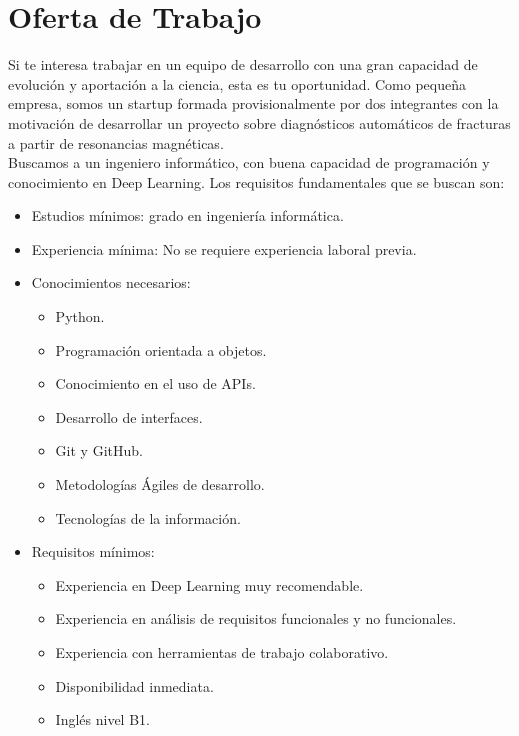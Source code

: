 	\listoftables	
	
	\newpage	
 
\section{Oferta de Trabajo}

Si te interesa trabajar en un equipo de desarrollo con una gran capacidad de evolución y aportación a la ciencia, esta es tu oportunidad. Como pequeña empresa, somos un startup formada provisionalmente por dos integrantes con la motivación de desarrollar un proyecto sobre diagnósticos automáticos de fracturas a partir de resonancias magnéticas. \\

Buscamos a un ingeniero informático, con buena capacidad de programación y conocimiento en Deep Learning. Los requisitos fundamentales que se buscan son:

\begin{itemize}
	\item Estudios mínimos: grado en ingeniería informática.
	\item Experiencia mínima: No se requiere experiencia laboral previa.	
	\item Conocimientos necesarios:
		\begin{itemize}
			\item Python.
			\item Programación orientada a objetos.
			\item Conocimiento en el uso de APIs.
			\item Desarrollo de interfaces.
			\item Git y GitHub.
			\item Metodologías Ágiles de desarrollo.
			\item Tecnologías de la información.
		\end{itemize}
	\item Requisitos mínimos:
	\begin{itemize}
		\item Experiencia en Deep Learning muy recomendable.
		\item Experiencia en análisis de requisitos funcionales y no funcionales.
		\item Experiencia con herramientas de trabajo colaborativo.
		\item Disponibilidad inmediata.
		\item Inglés nivel B1.
	\end{itemize}
\end{itemize}

